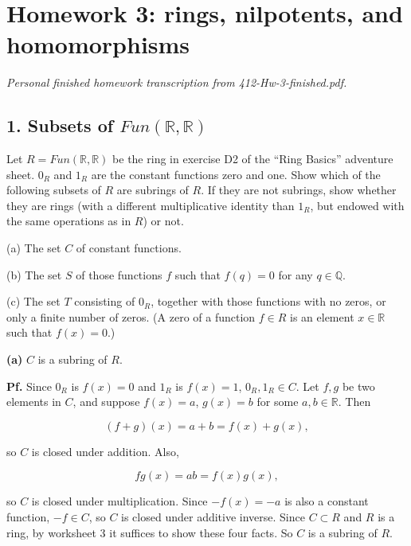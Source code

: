 \chapter{Homework 3: rings, nilpotents, and homomorphisms}

\emph{Personal finished homework transcription from 412-Hw-3-finished.pdf.}

\section{\texorpdfstring{1. Subsets of \(Fun\left( {\mathbb{R},\mathbb{R}} \right)\)}{1. Subsets of Fun\textbackslash left( \{\textbackslash mathbb\{R\},\textbackslash mathbb\{R\}\} \textbackslash right)}}

Let \(R = Fun\left( {\mathbb{R},\mathbb{R}} \right)\) be the ring in exercise D2 of the ``Ring Basics'' adventure sheet. \(0_{R}\) and \(1_{R}\) are the constant functions zero and one. Show which of the following subsets of \(R\) are subrings of \(R\). If they are not subrings, show whether they are rings (with a different multiplicative identity than \(1_{R}\), but endowed with the same operations as in \(R\)) or not.

(a) The set \(C\) of constant functions.

(b) The set \(S\) of those functions \(f\) such that \(f(q) = 0\) for any \(q \in \mathbb{Q}\).

(c) The set \(T\) consisting of \(0_{R}\), together with those functions with no zeros, or only a finite number of zeros. (A zero of a function \(f \in R\) is an element \(x \in \mathbb{R}\) such that \(f(x) = 0\).)

\textbf{(a)} \(C\) is a subring of \(R\).

\textbf{Pf.} Since \(0_{R}\) is \(f(x) = 0\) and \(1_{R}\) is \(f(x) = 1\), \(0_{R},1_{R} \in C\). Let \(f,g\) be two elements in \(C\), and suppose \(f(x) = a\), \(g(x) = b\) for some \(a,b \in \mathbb{R}\). Then

\[\left( {f + g} \right)(x) = a + b = f(x) + g(x),\]

so \(C\) is closed under addition. Also,

\[fg(x) = ab = f(x)g(x),\]

so \(C\) is closed under multiplication. Since \(- f(x) = - a\) is also a constant function, \(- f \in C\), so \(C\) is closed under additive inverse. Since \(C \subset R\) and \(R\) is a ring, by worksheet 3 it suffices to show these four facts. So \(C\) is a subring of \(R\).

